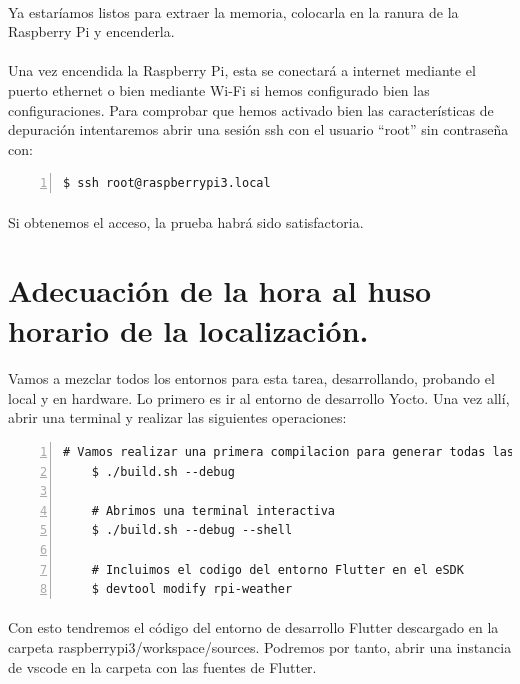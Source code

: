\paragraph{}Ya estaríamos listos para extraer la memoria, colocarla en la ranura de
la Raspberry Pi y encenderla.

\paragraph{}Una vez encendida la Raspberry Pi, esta se conectará a internet mediante
el puerto ethernet o bien mediante Wi-Fi si hemos configurado bien las configuraciones.
Para comprobar que hemos activado bien las características de depuración intentaremos
abrir una sesión ssh con el usuario ``root'' sin contraseña con:

\begin{lstlisting}[style=consola, numbers=left]
    $ ssh root@raspberrypi3.local
\end{lstlisting}

\paragraph{}Si obtenemos el acceso, la prueba habrá sido satisfactoria.

\section{Adecuación de la hora al huso horario de la localización.}

\paragraph{}Vamos a mezclar todos los entornos para esta tarea, desarrollando, probando
el local y en hardware. Lo primero es ir al entorno de desarrollo Yocto. Una vez allí,
abrir una terminal y realizar las siguientes operaciones:

\begin{lstlisting}[style=consola, numbers=left]
    # Vamos realizar una primera compilacion para generar todas las tools del SDK
    $ ./build.sh --debug

    # Abrimos una terminal interactiva
    $ ./build.sh --debug --shell

    # Incluimos el codigo del entorno Flutter en el eSDK
    $ devtool modify rpi-weather
\end{lstlisting}

\paragraph{}Con esto tendremos el código del entorno de desarrollo Flutter descargado
en la carpeta raspberrypi3/workspace/sources. Podremos por tanto, abrir una instancia
de \Gls{vscode} en la carpeta con las fuentes de Flutter.

